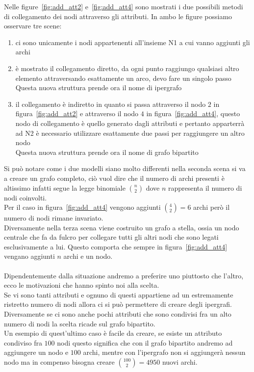 %
Nelle figure~\ref{fig:add_att2} e~\ref{fig:add_att4} sono mostrati i due possibili metodi di collegamento dei nodi attraverso gli attributi. In ambo le figure possiamo osservare tre scene:
\begin{enumerate}
	\item ci sono unicamente i nodi appartenenti all'insieme N1 a cui vanno aggiunti gli archi
	\item è mostrato il collegamento diretto, da ogni punto raggiungo qualsiasi altro elemento attraversando esattamente un arco, devo fare un singolo passo\\
	Questa nuova struttura prende ora il nome di ipergrafo
	\item il collegamento è indiretto in quanto si passa attraverso il nodo $2$ in figura~\ref{fig:add_att2} e attraverso il nodo $4$ in figura~\ref{fig:add_att4}, questo nodo di collegamento è quello generato dagli attributi e pertanto apparterrà ad N2
	è necessario utilizzare esattamente due passi per raggiungere un altro nodo\\
	Questa nuova struttura prende ora il nome di grafo bipartito
\end{enumerate}
%
Si può notare come i due modelli siano molto differenti nella seconda scena si va a creare un grafo completo, ciò vuol dire che il numero di archi presenti è altissimo infatti segue la legge binomiale $ \displaystyle\binom{n}{2}$ dove $n$ rappresenta il numero di nodi coinvolti.\\
Per il caso in figura~\ref{fig:add_att4} vengono aggiunti $ \displaystyle\binom{4}{2} = 6$ archi però il numero di nodi rimane invariato.\\
Diversamente nella terza scena viene costruito un grafo a stella, ossia un nodo centrale che fa da fulcro per collegare tutti gli altri nodi che sono legati esclusivamente a lui. Questo comporta che sempre in figura~\ref{fig:add_att4} vengano aggiunti $n$ archi e un nodo.\\
\\
Dipendentemente dalla situazione andremo a preferire uno piuttosto che l'altro, ecco le motivazioni che hanno spinto noi alla scelta.\\
Se vi sono tanti attributi e ognuno di questi appartiene ad un estremamente ristretto numero di nodi allora ci si può permettere di creare degli ipergrafi. Diversamente se ci sono anche pochi attributi che sono condivisi fra un alto numero di nodi la scelta ricade sul grafo bipartito.\\
Un esempio di quest'ultimo caso è facile da creare, se esiste un attributo condiviso fra $100$ nodi questo significa che con il grafo bipartito andremo ad aggiungere un nodo e $100$ archi, mentre con l'ipergrafo non si aggiungerà nessun nodo ma in compenso bisogna creare $ \displaystyle\binom{100}{2} = 4950$ nuovi archi.\\
